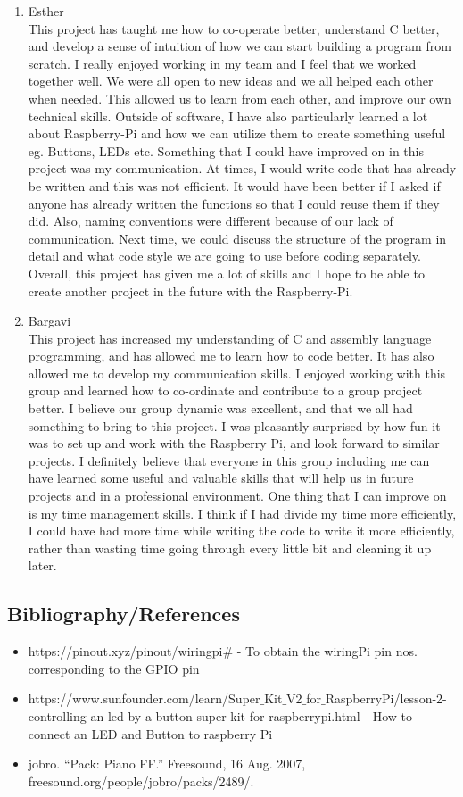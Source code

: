 \documentclass[11pt]{article}
\begin{document}
\begin{enumerate}
\\
\item Esther
\\
This project has taught me how to co-operate better, understand C better, and develop a sense of intuition of how we can start building a program from scratch. I really enjoyed working in my team and I feel that we worked together well. We were all open to new ideas and we all helped each other when needed. This allowed us to learn from each other, and improve our own technical skills. Outside of software, I have also particularly learned a lot about Raspberry-Pi and how we can utilize them to create something useful eg. Buttons, LEDs etc. Something that I could have improved on in this project was my communication. At times, I would write code that has already be written and this was not efficient. It would have been better if I asked if anyone has already written the functions so that I could reuse them if they did. Also, naming conventions were different because of our lack of communication. Next time, we could discuss the structure of the program in detail and what code style we are going to use before coding separately. Overall, this project has given me a lot of skills and I hope to be able to create another project in the future with the Raspberry-Pi.
\item Bargavi
\\
This project has increased my understanding of C and assembly language programming, and has allowed me to learn how to code better. It has also allowed me to develop my communication skills. I enjoyed working with this group and learned how to co-ordinate and contribute to a group project better. I believe our group dynamic was excellent, and that we all had something to bring to this project. I was pleasantly surprised by how fun it was to set up and work with the Raspberry Pi, and look forward to similar projects. I definitely believe that everyone in this group including me can have learned some useful and valuable skills that will help us in future projects and in a professional environment. One thing that I can improve on is my time management skills. I think if I had divide my time more efficiently, I could have had more time while writing the code to write it more efficiently, rather than wasting time going through every little bit and cleaning it up later. 
\end{enumerate}
\subsection{Bibliography/References }
\begin{itemize}
\item https://pinout.xyz/pinout/wiringpi\# - To obtain the wiringPi pin nos. corresponding to the GPIO pin
\item https://www.sunfounder.com/learn/Super$\_$Kit$\_$V2$\_$for$\_$RaspberryPi/lesson-2-controlling-an-led-by-a-button-super-kit-for-raspberrypi.html  - How to connect an LED and Button to raspberry Pi
\item jobro. “Pack: Piano FF.” Freesound, 16 Aug. 2007, freesound.org/people/jobro/packs/2489/.

\end{itemize}
\end{document}
